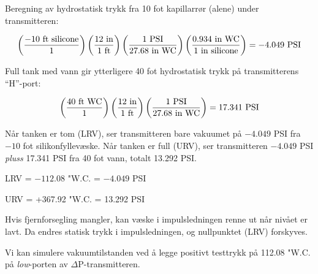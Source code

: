 






Beregning av hydrostatisk trykk fra 10 fot kapillarrør (alene) under transmitteren:

$$\left(-10 \hbox{ ft silicone} \over 1 \right) \left(12 \hbox{ in} \over 1 \hbox{ ft} \right) \left(1 \hbox{ PSI} \over 27.68 \hbox{ in WC} \right) \left(0.934 \hbox{ in WC} \over 1 \hbox{ in silicone} \right) = -4.049 \hbox{ PSI}$$

\vskip 10pt

Full tank med vann gir ytterligere 40 fot hydrostatisk trykk på transmitterens ``H''-port:

$$\left(40 \hbox{ ft WC} \over 1 \right) \left(12 \hbox{ in} \over 1 \hbox{ ft} \right) \left(1 \hbox{ PSI} \over 27.68 \hbox{ in WC} \right) = 17.341 \hbox{ PSI}$$

\vskip 10pt

Når tanken er tom (LRV), ser transmitteren bare vakuumet på $-4.049$ PSI fra $-10$ fot silikonfyllevæske.  Når tanken er full (URV), ser transmitteren $-4.049$ PSI {\it pluss} 17.341 PSI fra 40 fot vann, totalt 13.292 PSI.

\vskip 10pt

LRV = $-112.08$ "W.C. = $-4.049$ PSI

\vskip 10pt

URV = +367.92 "W.C. = 13.292 PSI

\vskip 10pt

Hvis fjernforsegling mangler, kan væske i impulsledningen renne ut når nivået er lavt.  Da endres statisk trykk i impulsledningen, og nullpunktet (LRV) forskyves.

\vskip 10pt

Vi kan simulere vakuumtilstanden ved å legge positivt testtrykk på 112.08 "W.C. på {\it low}-porten av $\Delta$P-transmitteren.


